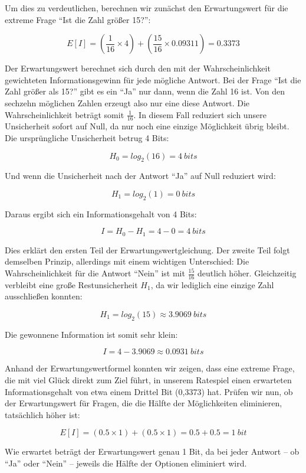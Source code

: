 \documentclass[
  letterpaper,
  DIV=11]{scrreprt}
\begin{document}
Um dies zu verdeutlichen, berechnen wir zunächst den Erwartungswert für
die extreme Frage ``Ist die Zahl größer 15?'':

\[
E[I] = \left( \frac{1}{16}\times 4 \right)+ \left(\frac{15}{16}\times 0.09311 \right)= 0.3373
\]

Der Erwartungswert berechnet sich durch den mit der Wahrscheinlichkeit
gewichteten Informationsgewinn für jede mögliche Antwort. Bei der Frage
``Ist die Zahl größer als 15?'' gibt es ein ``Ja'' nur dann, wenn die
Zahl 16 ist. Von den sechzehn möglichen Zahlen erzeugt also nur eine
diese Antwort. Die Wahrscheinlichkeit beträgt somit \(\frac{1}{16}\). In
diesem Fall reduziert sich unsere Unsicherheit sofort auf Null, da nur
noch eine einzige Möglichkeit übrig bleibt. Die ursprüngliche
Unsicherheit betrug 4 Bits:

\[
H_0 = log_2(16) = 4~bits
\]

Und wenn die Unsicherheit nach der Antwort ``Ja'' auf Null reduziert
wird:

\[
H_1 = log_2(1) = 0~bits
\]

Daraus ergibt sich ein Informationsgehalt von 4 Bits:

\[
I = H_0 - H_1 = 4 - 0 = 4~bits
\]

Dies erklärt den ersten Teil der Erwartungswertgleichung. Der zweite
Teil folgt demselben Prinzip, allerdings mit einem wichtigen
Unterschied: Die Wahrscheinlichkeit für die Antwort ``Nein'' ist mit
\(\frac{15}{16}\) deutlich höher. Gleichzeitig verbleibt eine große
Restunsicherheit \(H_1\), da wir lediglich eine einzige Zahl
ausschließen konnten:

\[
H_1 = log_2(15) \approx 3.9069~bits
\]

Die gewonnene Information ist somit sehr klein:

\[
I = 4 - 3.9069 \approx 0.0931~bits
\]

Anhand der Erwartungswertformel konnten wir zeigen, dass eine extreme
Frage, die mit viel Glück direkt zum Ziel führt, in unserem Ratespiel
einen erwarteten Informationsgehalt von etwa einem Drittel Bit (0,3373)
hat. Prüfen wir nun, ob der Erwartungswert für Fragen, die die Hälfte
der Möglichkeiten eliminieren, tatsächlich höher ist:

\[
E[I] = \left(0.5 \times 1 \right) + \left(0.5 \times 1 \right) = 0.5 + 0.5 = 1~bit
\]

Wie erwartet beträgt der Erwartungswert genau 1 Bit, da bei jeder
Antwort -- ob ``Ja'' oder ``Nein'' -- jeweils die Hälfte der Optionen
eliminiert wird.
\end{document}
